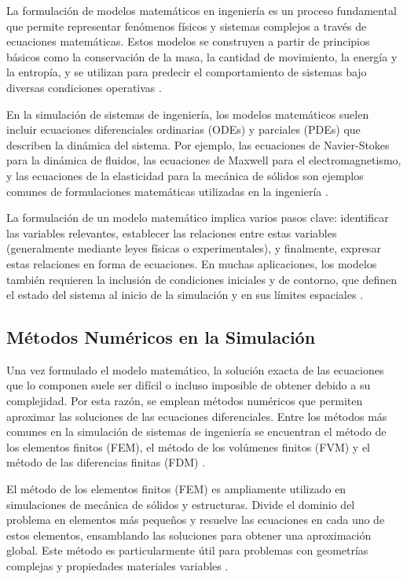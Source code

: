 La formulación de modelos matemáticos en ingeniería es un proceso fundamental que permite representar fenómenos físicos y sistemas complejos a través de ecuaciones matemáticas. Estos modelos se construyen a partir de principios básicos como la conservación de la masa, la cantidad de movimiento, la energía y la entropía, y se utilizan para predecir el comportamiento de sistemas bajo diversas condiciones operativas \cite{zienkiewicz2005finite}.

En la simulación de sistemas de ingeniería, los modelos matemáticos suelen incluir ecuaciones diferenciales ordinarias (ODEs) y parciales (PDEs) que describen la dinámica del sistema. Por ejemplo, las ecuaciones de Navier-Stokes para la dinámica de fluidos, las ecuaciones de Maxwell para el electromagnetismo, y las ecuaciones de la elasticidad para la mecánica de sólidos son ejemplos comunes de formulaciones matemáticas utilizadas en la ingeniería \cite{white2006fluid}. 

La formulación de un modelo matemático implica varios pasos clave: identificar las variables relevantes, establecer las relaciones entre estas variables (generalmente mediante leyes físicas o experimentales), y finalmente, expresar estas relaciones en forma de ecuaciones. En muchas aplicaciones, los modelos también requieren la inclusión de condiciones iniciales y de contorno, que definen el estado del sistema al inicio de la simulación y en sus límites espaciales \cite{timoshenko1983history}.

\subsection{Métodos Numéricos en la Simulación}

Una vez formulado el modelo matemático, la solución exacta de las ecuaciones que lo componen suele ser difícil o incluso imposible de obtener debido a su complejidad. Por esta razón, se emplean métodos numéricos que permiten aproximar las soluciones de las ecuaciones diferenciales. Entre los métodos más comunes en la simulación de sistemas de ingeniería se encuentran el método de los elementos finitos (FEM), el método de los volúmenes finitos (FVM) y el método de las diferencias finitas (FDM) \cite{versteeg2007introduction}.

El método de los elementos finitos (FEM) es ampliamente utilizado en simulaciones de mecánica de sólidos y estructuras. Divide el dominio del problema en elementos más pequeños y resuelve las ecuaciones en cada uno de estos elementos, ensamblando las soluciones para obtener una aproximación global. Este método es particularmente útil para problemas con geometrías complejas y propiedades materiales variables \cite{zienkiewicz2005finite}.

